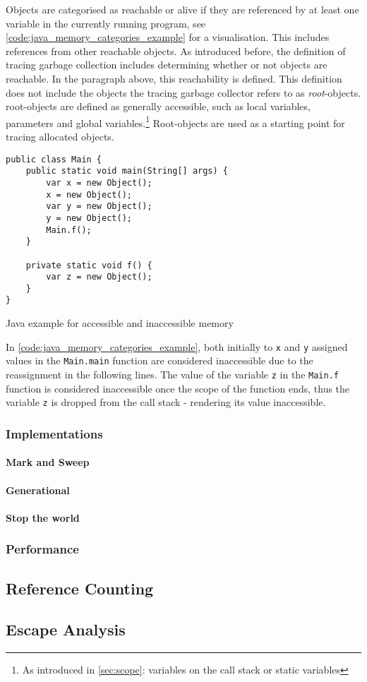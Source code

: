 Objects are categorised as reachable or alive if they are referenced by at
least one variable in the currently running program, see
\autoref{code:java_memory_categories_example} for a visualisation. This includes
references from other reachable objects. As introduced before, the definition
of tracing garbage collection includes determining whether or not objects are
reachable. In the paragraph above, this reachability is defined. This
definition does not include the objects the tracing garbage collector refers to
as \textit{root}-objects. root-objects are defined as generally accessible,
such as local variables, parameters and global variables.\footnote{As
introduced in \autoref{sec:scope}: variables on the call stack or static
variables} Root-objects are used as a starting point for tracing allocated
objects.

\begin{listing}[H] 
    \begin{verbatim} 
public class Main {
    public static void main(String[] args) {
        var x = new Object();
        x = new Object();
        var y = new Object();
        y = new Object();
        Main.f();
    }

    private static void f() {
        var z = new Object();
    }
}
    \end{verbatim}
    \caption{Java example for accessible and inaccessible memory}
    \label{code:java_memory_categories_example}
\end{listing}

In \autoref{code:java_memory_categories_example}, both initially to \texttt{x}
and \texttt{y} assigned values in the \texttt{Main.main} function are
considered inaccessible due to the reassignment in the following lines. The
value of the variable \texttt{z} in the \texttt{Main.f} function is considered
inaccessible once the scope of the function ends, thus the variable \texttt{z}
is dropped from the call stack - rendering its value inaccessible. 


\subsubsection{Implementations}
\paragraph{Mark and Sweep}
\paragraph{Generational}
\paragraph{Stop the world}
\subsubsection{Performance}

\subsection{Reference Counting}
\subsection{Escape Analysis}
